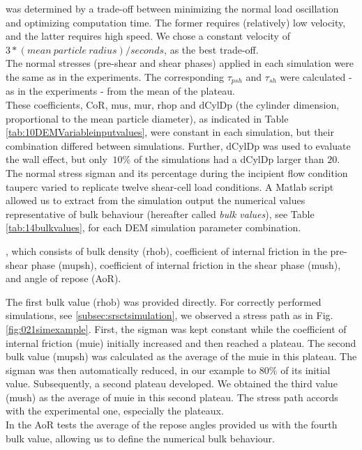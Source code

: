was determined by a trade-off between minimizing the normal load oscillation and
optimizing computation time. 
The former requires (relatively) low velocity, and the latter requires high
speed.
We chose a constant velocity of $3*(mean ~ particle ~ radius)/seconds$, as the
best trade-off.\\
The normal stresses (pre-shear and shear phases) applied in each simulation were
the same as in the experiments.
The corresponding $\tau_{psh}$ and $\tau_{sh}$ were calculated - as in the experiments - from the mean of the plateau.\\
These coefficients, \acs{CoR}, \acs{mus}, \acs{mur},
\acs{rhop} and \acs{dCylDp} (the cylinder dimension, proportional to the mean
particle diameter), as indicated in Table \ref{tab:10DEMVariableinputvalues}, 
were constant in each simulation, but their combination differed between
simulations.
Further, \acs{dCylDp} was used to evaluate the wall effect, but only $~10\%$ of the
simulations had a \acs{dCylDp} larger than $20$.
The normal stress \acs{sigman} and its
percentage during the incipient flow condition \acs{tauperc}
varied to replicate twelve shear-cell load conditions. 
A Matlab script allowed us to extract from the simulation output the numerical
values representative of bulk behaviour (hereafter called \textit{bulk values}),
see Table \ref{tab:14bulkvalues},
for each \acs{DEM} simulation parameter combination.

, which consists of
 bulk density (\acs{rhob}),
 coefficient of internal friction in the pre-shear phase (\acs{mupsh}),
 coefficient of internal friction in the shear phase (\acs{mush}),
 and angle of repose (\acs{AoR}).
 
 
The first bulk value (\acs{rhob}) was provided directly. 
For correctly performed simulations, see \ref{subsec:srsctsimulation}, we
observed a stress path as in Fig. \ref{fig:021simexample}.
First, the \acs{sigman} was kept constant while the coefficient of internal
friction (\acs{muie}) initially increased and then reached a plateau.
The second bulk value (\acs{mupsh}) was calculated as the average of the
\acs{muie} in this plateau.
The \acs{sigman} was then automatically reduced, in our example to $80 \%$ of
its initial value.
Subsequently, a second plateau developed.
We obtained the third
value (\acs{mush}) as the average of \acs{muie} in this second plateau.
The stress path accords with the experimental one, especially the plateaux.\\
In the \acs{AoR} tests the average of the repose angles provided us with the fourth
bulk value, allowing us to define the numerical bulk behaviour.

